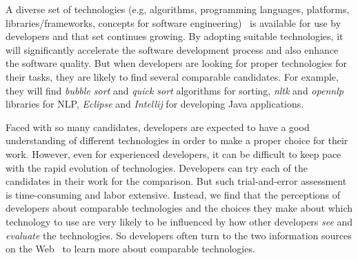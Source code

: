 
A diverse set of technologies (e.g, algorithms, programming languages, platforms, libraries/frameworks, concepts for software engineering)~\cite{chen2016explore, chen2016techland} is available for use by developers and that set continues growing.
By adopting suitable technologies, it will significantly accelerate the software development process and also enhance the software quality.
But when developers are looking for proper technologies for their tasks, they are likely to find several comparable candidates.
For example, they will find \textit{bubble sort} and \textit{quick sort} algorithms for sorting, \textit{nltk} and \textit{opennlp} libraries for NLP, \textit{Eclipse} and \textit{Intellij} for developing Java applications.

Faced with so many candidates, developers are expected to have a good understanding of different technologies in order to make a proper choice for their work.
However, even for experienced developers, it can be difficult to keep pace with the rapid evolution of technologies.
Developers can try each of the candidates in their work for the comparison.
But such trial-and-error assessment is time-consuming and labor extensive.
Instead, we find that the perceptions of developers about comparable technologies and the choices they make about which technology to use are very likely to be influenced by how other developers \textit{see} and \textit{evaluate} the technologies.
So developers often turn to the two information sources on the Web~\cite{bao2017extracting} to learn more about comparable technologies.

